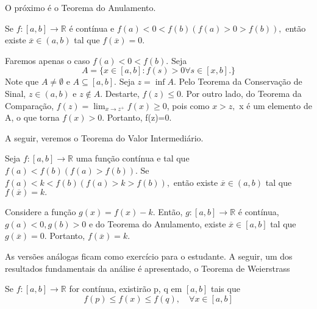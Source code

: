 \documentclass[analysis_notes.tex]{subfiles}
\begin{document}
O pr\'oximo \'e o Teorema do Anulamento.
\begin{theorem*}
	Se $f:[a,b]\rightarrow \mathbb{R}$ \'e cont\'inua e $f(a)<0<f(b) (f(a)>0>f(b)),$ ent\~ao existe $\overline{x}\in(a, b)$ tal que $f(\overline{x}) =0.$
\end{theorem*}
\begin{proof*}
	Faremos apenas o caso $f(a)<0<f(b).$ Seja
	$$
		A = \{x\in[a,b]:f(s)>0 \forall s\in[x, b].\}
	$$
	Note que $A\neq\emptyset$ e $A\subseteq{[a, b]}.$ Seja $z =\inf{A}$. Pelo Teorema da Conserva\c c\~ao de Sinal,
	$z\in(a, b)$ e $z\not\in A.$ Destarte, $f(z)\leq{0}.$ Por outro lado, do Teorema da Compara\c c\~ao, $f(z)=
		\lim_{x\to z^{+}}f(x)\geq{0}$, pois como $x > z,$ x \'e um elemento de A, o que torna $f(x)>0$. Portanto, f(z)=0.
\end{proof*}
A seguir, veremos o Teorema do Valor Intermedi\'ario.
\begin{theorem*}
	Seja $f:[a, b]\rightarrow \mathbb{R}$ uma fun\c c\~ao cont\'inua e tal que  $f(a)<f(b)(f(a)>f(b))$. Se $f(a)<k<f(b)(f(a)>k>f(b)),$
	ent\~ao existe $\overline{x}\in(a, b)$ tal que $f(\overline{x})=k.$
\end{theorem*}
\begin{proof*}
	Considere a fun\c c\~ao $g(x)=f(x)-k.$ Ent\~ao, $g:[a, b]\rightarrow \mathbb{R}$ \'e cont\'inua, $g(a)<0, g(b)>0$
	e do Teorema do Anulamento, existe $\overline{x}\in[a, b]$ tal que $g(\overline{x})=0.$ Portanto, $f(\overline{x})=k.$\qedsymbol
\end{proof*}
As vers\~oes an\'alogas ficam como exerc\'icio para o estudante.
A seguir, um dos resultados fundamentais da an\'alise \'e apresentado, o Teorema de Weierstrass
\begin{theorem*}
	Se $f:[a, b]\rightarrow \mathbb{R}$ for cont\'inua, existir\~ao p, q em $[a, b]$ tais que
	$$
		f(p)\leq f(x)\leq f(q),\quad \forall x\in[a,b]
	$$
\end{theorem*}
\end{document}
